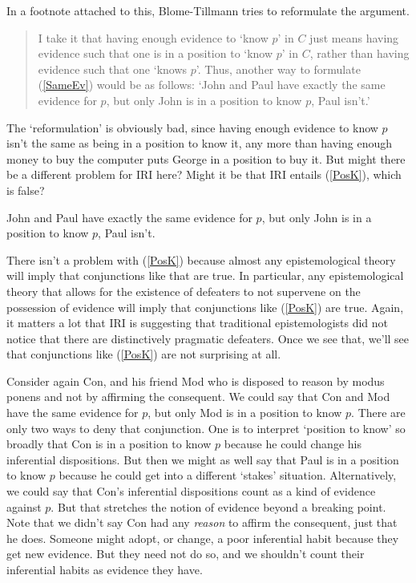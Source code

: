 \documentclass[oneside]{book}
\renewcommand{\numbex}[2]{
\begin{enumerate*}
\setcounter{enumi}{\value{paper}}
\renewcommand{\labelenumi}{(\arabic{enumi})}
#2
\end{enumerate*}
\addtocounter{paper}{#1}}
\begin{document}
In a footnote attached to this, Blome-Tillmann tries to reformulate the argument.

\begin{quote}
\noindent I take it that having enough evidence to `know $p$' in $C$ just means having evidence such that one is in a position to `know $p$' in $C$, rather than having evidence such that one `knows $p$'. Thus, another way to formulate (\ref{SameEv}) would be as follows: `John and Paul have exactly the same evidence for $p$, but only John is in a position to know $p$, Paul isn't.' \cite[329n23]{MBT2009}
\end{quote}

\noindent The `reformulation' is obviously bad, since having enough evidence to know $p$ isn't the same as being in a position to know it, any more than having enough money to buy the computer puts George in a position to buy it. But might there be a different problem for IRI here? Might it be that IRI entails (\ref{PosK}), which is false?

\numbex{1}{
\item \label{PosK} John and Paul have exactly the same evidence for $p$, but only John is in a position to know $p$, Paul isn't.}

\noindent There isn't a problem with (\ref{PosK}) because almost any epistemological theory will imply that conjunctions like that are true. In particular, any epistemological theory that allows for the existence of defeaters to not supervene on the possession of evidence will imply that conjunctions like (\ref{PosK}) are true. Again, it matters a lot that IRI is suggesting that traditional epistemologists did not notice that there are distinctively pragmatic defeaters. Once we see that, we'll see that conjunctions like (\ref{PosK}) are not surprising at all.

Consider again Con, and his friend Mod who is disposed to reason by modus ponens and not by affirming the consequent. We could say that Con and Mod have the same evidence for $p$, but only Mod is in a position to know $p$. There are only two ways to deny that conjunction. One is to interpret `position to know' so broadly that Con is in a position to know $p$ because he could change his inferential dispositions. But then we might as well say that Paul is in a position to know $p$ because he could get into a different `stakes' situation. Alternatively, we could say that Con's inferential dispositions count as a kind of evidence against $p$. But that stretches the notion of evidence beyond a breaking point. Note that we didn't say Con had any \textit{reason} to affirm the consequent, just that he does. Someone might adopt, or change, a poor inferential habit because they get new evidence. But they need not do so, and we shouldn't count their inferential habits as evidence they have.
\end{document}

